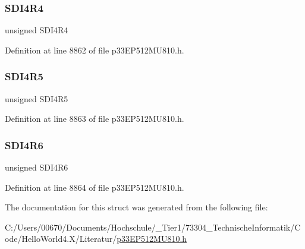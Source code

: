 \subsubsection{\texorpdfstring{S\+D\+I4\+R4}{SDI4R4}}
{\footnotesize\ttfamily unsigned S\+D\+I4\+R4}



Definition at line 8862 of file p33\+E\+P512\+M\+U810.\+h.

\mbox{\label{structtag_r_p_i_n_r31_b_i_t_s_a24543ce11b0dec1c497ccc7200b8e306}} 
\subsubsection{\texorpdfstring{S\+D\+I4\+R5}{SDI4R5}}
{\footnotesize\ttfamily unsigned S\+D\+I4\+R5}



Definition at line 8863 of file p33\+E\+P512\+M\+U810.\+h.

\mbox{\label{structtag_r_p_i_n_r31_b_i_t_s_aa38e2536303a8eeaef20ff248c90d642}} 
\subsubsection{\texorpdfstring{S\+D\+I4\+R6}{SDI4R6}}
{\footnotesize\ttfamily unsigned S\+D\+I4\+R6}



Definition at line 8864 of file p33\+E\+P512\+M\+U810.\+h.



The documentation for this struct was generated from the following file\+:\begin{DoxyCompactItemize}
\item 
C\+:/\+Users/00670/\+Documents/\+Hochschule/\+\_\+\+Tier1/73304\+\_\+\+Technische\+Informatik/\+Code/\+Hello\+World4.\+X/\+Literatur/\hyperlink{p33_e_p512_m_u810_8h}{p33\+E\+P512\+M\+U810.\+h}\end{DoxyCompactItemize}
